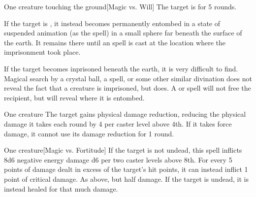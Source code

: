 \spellrng{\rngclose}
\begin{spelltarget}{One creature touching the ground}[Magic vs. Will]
    \spellsuccess The target is \slowed for 5 rounds.

    \spellsuccess If the target is \bloodied, it instead becomes permanently entombed in a state of suspended animation (as the  spell) in a small sphere far beneath the surface of the earth. It remains there until an  spell is cast at the location where the imprisonment took place.
\end{spelltarget}

\spellnotes If the target becomes inprisoned beneath the earth, it is very difficult to find. Magical search by a crystal ball, a  spell, or some other similar divination does not reveal the fact that a creature is imprisoned, but  does. A  or  spell will not free the recipient, but will reveal where it is entombed.

\spellrng{\rngclose}
\spelldur{\durshort}
\begin{spelltarget}{One creature}
    \spelleffect The target gains physical damage reduction, reducing the physical damage it takes each round by 4  per caster level above 4th. If it takes force damage, it cannot use its damage reduction for 1 round.
\end{spelltarget}

\spellrng{\rngclose}
\begin{spelltarget}{One creature}[Magic vs. Fortitude]
    \spellsuccess If the target is not undead, this spell inflicts 8d6 negative energy damage \add d6 per two caster levels above 8th. For every 5 points of damage dealt in excess of the target's hit points, it can instead inflict 1 point of critical damage.
    \spellfailure As above, but half damage.
    \spelleffect If the target is undead, it is instead healed for that much damage.
\end{spelltarget}

